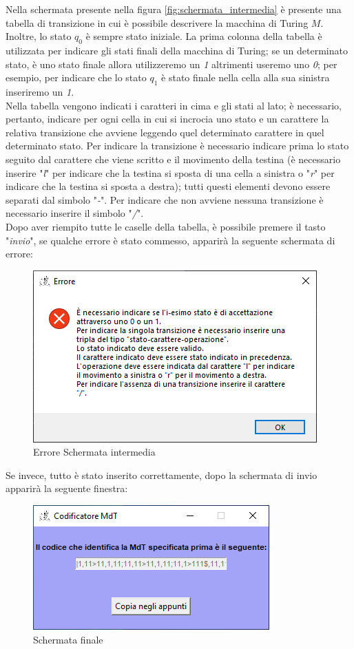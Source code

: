 \documentclass[a4paper,12pt,titlepage,oneside]{book}
\begin{document}
Nella schermata presente nella figura \ref{fig:schermata_intermedia} è presente una tabella di transizione in cui è possibile descrivere la macchina di Turing $M$. Inoltre, lo stato $q_0$ è sempre stato iniziale. La prima colonna della tabella è utilizzata per indicare gli stati finali della macchina di Turing; se un determinato stato, è uno stato finale allora utilizzeremo un \emph{1} altrimenti useremo uno \emph{0}; per esempio, per indicare che lo stato $q_1$ è stato finale nella cella alla sua sinistra inseriremo un \emph{1}.\\
Nella tabella vengono indicati i caratteri in cima e gli stati al lato; è necessario, pertanto, indicare per ogni cella in cui si incrocia uno stato e un carattere la relativa transizione che avviene leggendo quel determinato carattere in quel determinato stato. Per indicare la transizione è necessario indicare prima lo stato seguito dal carattere che viene scritto e il movimento della testina (è necessario inserire "\emph{l}" per indicare che la testina si sposta di una cella a sinistra o "\emph{r}" per indicare che la testina si sposta a destra); tutti questi elementi devono essere separati dal simbolo "\emph{-}". Per indicare che non avviene nessuna transizione è necessario inserire il simbolo "\emph{/}".\\
Dopo aver riempito tutte le caselle della tabella, è possibile premere il tasto "\emph{invio}", se qualche errore è stato commesso, apparirà la seguente schermata di errore:

\clearpage

\begin{figure}[!h]
	\centering
	\includegraphics[width=.5\textwidth]{Images/errore_schermata_intermedia.png}
	\caption{Errore Schermata intermedia}
	\label{fig:errore_schermata_intermedia}
\end{figure}

Se invece, tutto è stato inserito correttamente, dopo la schermata di invio apparirà la seguente finestra:

\begin{figure}[!htpb]
	\centering
	\includegraphics[width=.5\textwidth]{Images/schermata_finale.png}
	\caption{Schermata finale}
	\label{fig:schermata_finale}
\end{figure}
\end{document}
